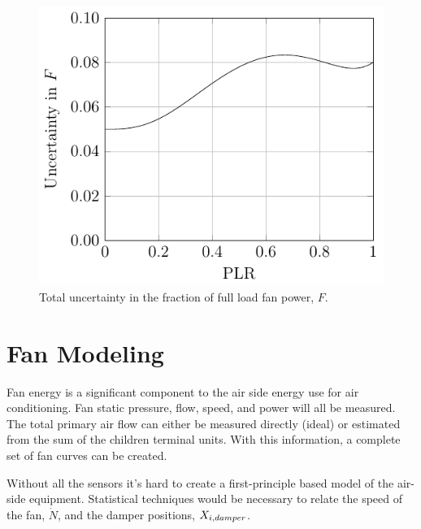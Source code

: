 \begin{figure}
\centering
\includegraphics{Plots/2017-05-15-totalFFLPUncertainty.pdf}
\caption{Total uncertainty in the fraction of full load fan power, \(F\).}
\label{fig:TotalFFLRUncertainty}
\end{figure}





\section{Fan Modeling}\label{sec:FanModeling}

Fan energy is a significant component to the air side energy use for air
conditioning. Fan static pressure, flow, speed, and power will all be
measured.  The total primary air flow can either be measured directly
(ideal) or estimated from the sum of the children terminal units. With
this information, a complete set of fan curves can be created.

Without all the sensors it's hard to create a first-principle based model
of the air-side equipment. Statistical techniques would be necessary to relate
the speed of the fan, \(\dot N\), and the damper positions,
\(X_{i,damper}\).

